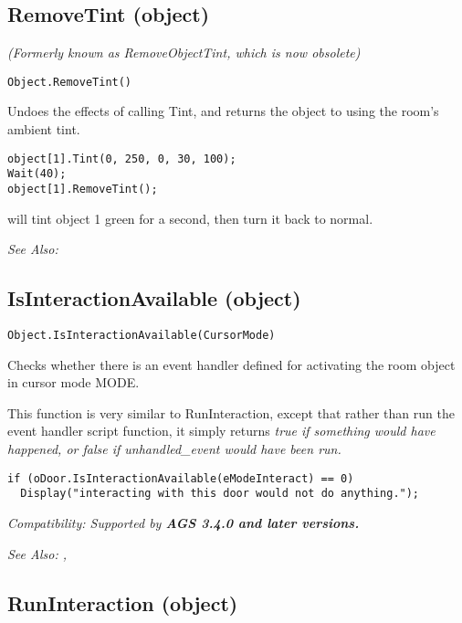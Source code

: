 \subsection{RemoveTint (object)}\label{Object.RemoveTint}%

\it{(Formerly known as RemoveObjectTint, which is now obsolete)}

\begin{verbatim}
Object.RemoveTint()
\end{verbatim}

Undoes the effects of calling Tint, and returns the object to using the room's ambient tint.

\begin{verbatim}
object[1].Tint(0, 250, 0, 30, 100);
Wait(40);
object[1].RemoveTint();
\end{verbatim}
will tint object 1 green for a second, then turn it back to normal.

\it{See Also:} 


\subsection{IsInteractionAvailable (object)}\label{Object.IsInteractionAvailable}%

\begin{verbatim}
Object.IsInteractionAvailable(CursorMode)
\end{verbatim}
Checks whether there is an event handler defined for activating the room object
in cursor mode MODE.

This function is very similar to RunInteraction, except that rather than run the event
handler script function, it simply returns \it{true} if something would have happened,
or \it{false} if unhandled_event would have been run.

\begin{verbatim}
if (oDoor.IsInteractionAvailable(eModeInteract) == 0)
  Display("interacting with this door would not do anything.");
\end{verbatim}

\it{Compatibility:} Supported by \bf{AGS 3.4.0} and later versions.

\it{See Also:} ,


\subsection{RunInteraction (object)}\label{Object.RunInteraction}%

